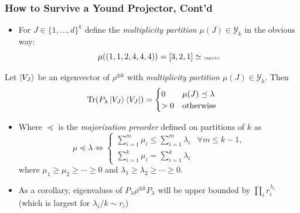 \documentclass[
    9pt,
    hyperref={bookmarks=false, colorlinks=false}, %
    xcolor={dvipsnames},
]{beamer}
\DeclareMathOperator{\Tr}{Tr}
\begin{document}
\begin{frame}
    \frametitle{How to Survive a Yound Projector, Cont'd}
    \begin{itemize}
        \item For $J \in \{1, \ldots, d\}^{k}$ define the \textit{multiplicity partition} $\mu(J) \in \mathcal Y_k$ in the obvious way:
            \[ \mu((1,1,2,4,4,4)) = [3, 2, 1] \simeq \scalebox{0.4}{\yng(3,2,1)} \]
    \end{itemize}
    \begin{theorem}
        Let $\ket{V_J}$ be an eigenvector of $\rho^{\otimes k}$ with \textit{multiplicity partition} $\mu(J) \in \mathcal Y_k$. Then
        \[ \Tr(P_\lambda \ket{V_J}\bra{V_J}) = \begin{cases} 0 & \mu(J) \preceq \lambda \\ > 0 & \text{otherwise} \end{cases} \]
    \end{theorem}
    \begin{itemize}
        \item Where $\preceq$ is the \textit{majorization preorder} defined on partitions of $k$ as
            \[ \mu \preceq \lambda \iff \begin{cases} \sum_{i=1}^{m} \mu_{i} \leq \sum_{i=1}^{m} \lambda_{i} & \forall m \leq k-1, \\ \sum_{i=1}^{k} \mu_{i} = \sum_{i=1}^{k} \lambda_{i} \end{cases} \]
        where $\mu_1 \geq \mu_2 \geq \cdots \geq 0$ and $\lambda_1 \geq \lambda_2 \geq \cdots \geq 0$.
        \item As a corollary, eigenvalues of $P_\lambda \rho^{\otimes k} P_{\lambda}$ will be upper bounded by $\prod_{i} r_i^{\lambda_i}$ (which is largest for $\lambda_i/k \sim r_i$)
    \end{itemize}
\end{frame}
\end{document}
